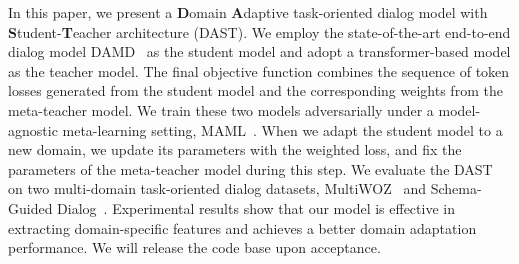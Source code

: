 \documentclass[letterpaper]{article} %
\begin{document}
In this paper, we present a \textbf{D}omain \textbf{A}daptive task-oriented dialog model  with \textbf{S}tudent-\textbf{T}eacher architecture (DAST).
%
We employ the state-of-the-art end-to-end dialog model DAMD~\citep{zhang2019task} as the student model and adopt a transformer-based model as the teacher model.
%
The final objective function combines the sequence of token losses generated from the student model and the corresponding weights from the meta-teacher model.
%
We train these two models adversarially under a model-agnostic meta-learning setting, MAML~\citep{finn2017model}.
%
When we adapt the student model to a new domain, we update its parameters with the weighted loss, and fix the parameters of the meta-teacher model during this step.
%
We evaluate the DAST on two multi-domain task-oriented dialog datasets,  MultiWOZ~\citep{budzianowski2018multiwoz} and  Schema-Guided Dialog~\citep{rastogi2019towards}.
%
Experimental results show that our model is effective in extracting domain-specific features and achieves a better domain adaptation performance.
%
We will release the code base upon acceptance.










\end{document}
